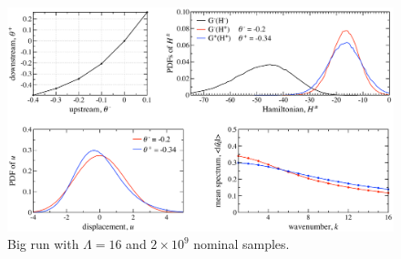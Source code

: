 \documentclass[12pt]{article}
\begin{document}
\begin{figure}%
\begin{center}
\includegraphics[width = 0.95 \textwidth]{Lambda16Run}
\caption{Big run with $\Lambda = 16$ and $2 \times 10^9$ nominal samples.}
\label{Lambda16Run}
\end{center}
\end{figure}
 



\end{document}
